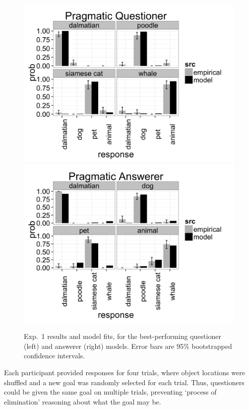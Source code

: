 \documentclass[12pt, floatsintext, jou]{apa6}
\begin{document}
\begin{figure}[t!]
\begin{center}
\includegraphics[scale = .11]{exp3QuestResultsPragmatic.png}
\includegraphics[scale = .11]{exp3AnsResultsPragmatic.png}
\end{center}
\caption{Exp.~1 results and model fits, for the best-performing questioner (left) and answerer (right) models. Error bars are 95\% bootstrapped confidence intervals.}
\label{fig:exp3res}
\end{figure}

Each participant provided responses for four trials, where object locations were shuffled and a new goal was randomly selected for each trial. Thus, questioners could be given the same goal on multiple trials, preventing `process of elimination' reasoning about what the goal may be.
\end{document}
